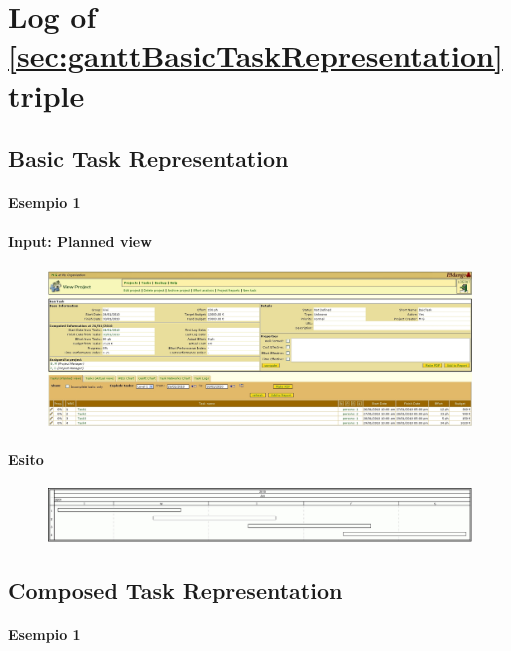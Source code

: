 \section{Log of \ref{sec:ganttBasicTaskRepresentation} triple}

\subsection{Basic Task Representation}
\paragraph{Esempio 1}
\paragraph{Input: Planned view}
\begin{figure}[h!]
\centering
\includegraphics[width=\textwidth]{tests/TEST_GANTT/3.1/BasicTask_Data.jpg}
\end{figure}

\paragraph{Esito}
\begin{figure}[h!]
\centering
\includegraphics[width=\textwidth]{tests/TEST_GANTT/3.1/BasicTask.jpg}
\end{figure}
\newpage

\subsection{Composed Task Representation}
\paragraph{Esempio 1}
